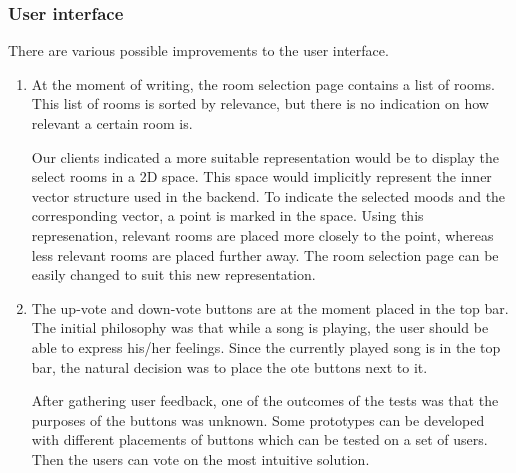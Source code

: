 \subsubsection{User interface}
There are various possible improvements to the user interface.

\begin{enumerate}
\item At the moment of writing, the room selection page contains a list of rooms.
This list of rooms is sorted by relevance, but there is no indication on how relevant a certain room is.

Our clients indicated a more suitable representation would be to display the select rooms in a 2D space.
This space would implicitly represent the inner vector structure used in the backend.
To indicate the selected moods and the corresponding vector, a point is marked in the space.
Using this represenation, relevant rooms are placed more closely to the point, whereas less relevant rooms are placed further away. The room selection page can be easily changed to suit this new representation.

\item The up-vote and down-vote buttons are at the moment placed in the top bar.
The initial philosophy was that while a song is playing, the user should be able to express his/her feelings.
Since the currently played song is in the top bar, the natural decision was to place the ote buttons next to it.

After gathering user feedback, one of the outcomes of the tests was that the purposes of the buttons was unknown.
Some prototypes can be developed with different placements of buttons which can be tested on a set of users.
Then the users can vote on the most intuitive solution.
\end{enumerate}
